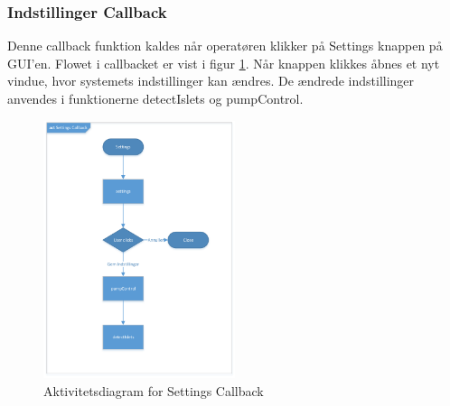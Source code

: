 \subsubsection{Indstillinger Callback}
Denne callback funktion kaldes når operatøren klikker på Settings knappen på GUI'en. Flowet i callbacket er vist i figur \ref{fig:act_settings}. Når knappen klikkes åbnes et nyt vindue, hvor systemets indstillinger kan ændres. De ændrede indstillinger anvendes i funktionerne detectIslets og pumpControl. 
\begin{figure}[H]
	\centering
	\includegraphics[width=0.5\textwidth]{billeder/act_settings-crop.pdf}
	\caption{Aktivitetsdiagram for Settings Callback}
	\label{fig:act_settings}
\end{figure}
